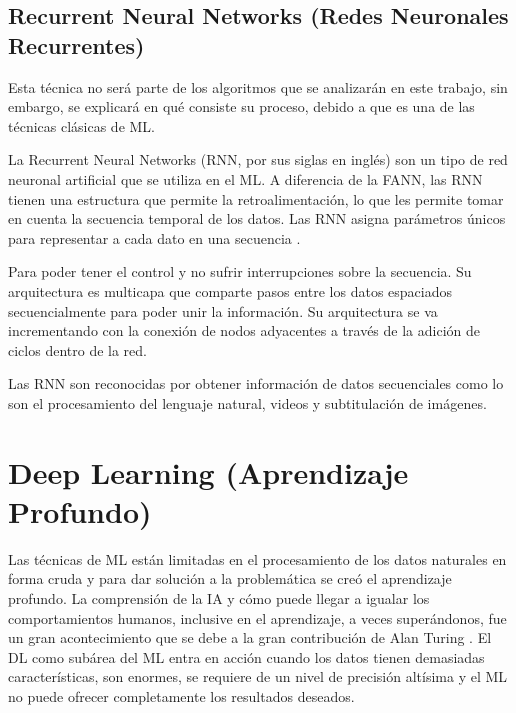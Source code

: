 \doublespacing
\subsection{Recurrent Neural Networks (Redes Neuronales Recurrentes)}
Esta técnica no será parte de los algoritmos que se analizarán en este trabajo, sin embargo, se explicará en qué consiste su proceso, debido a que es una de las técnicas clásicas de ML.\\
\par La Recurrent Neural Networks (RNN, por sus siglas en inglés) son un tipo de red neuronal artificial que se utiliza en el ML. A diferencia de la FANN, las RNN tienen una estructura que permite la retroalimentación, lo que les permite tomar en cuenta la secuencia temporal de los datos. Las RNN asigna parámetros únicos para representar a cada dato en una secuencia \cite{arana2021redes}.\\
\par Para poder tener el control y no sufrir interrupciones sobre la secuencia. Su arquitectura es multicapa que comparte pasos entre los datos espaciados secuencialmente para poder unir la información. Su arquitectura se va incrementando con la conexión de nodos adyacentes a través de la adición de ciclos dentro de la red.\\
\par Las RNN son reconocidas por obtener información de datos secuenciales como lo son el procesamiento del lenguaje natural, videos y subtitulación de imágenes.\\


\doublespacing
\section{Deep Learning (Aprendizaje Profundo)}
Las técnicas de ML están limitadas en el procesamiento de los datos naturales en forma cruda y para dar solución a la problemática se creó el aprendizaje profundo. La comprensión de la IA y cómo puede llegar a igualar los comportamientos humanos, inclusive en el aprendizaje, a veces superándonos, fue un gran acontecimiento que se debe a la gran contribución de Alan Turing \cite{Carola}. El DL como subárea del ML entra en acción cuando los datos tienen demasiadas características, son enormes, se requiere de un nivel de precisión altísima y el ML no puede ofrecer completamente los resultados deseados.\\


\doublespacing
